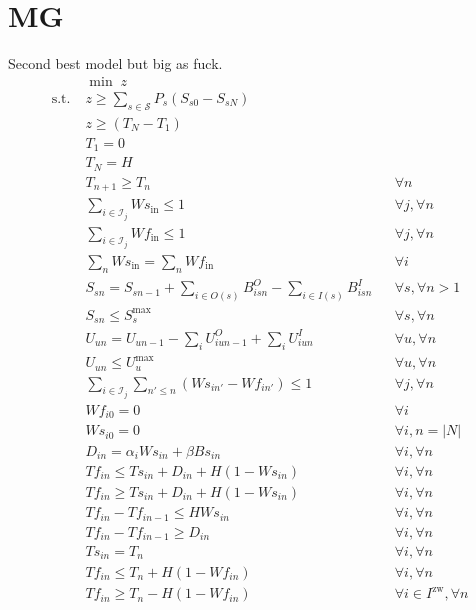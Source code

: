 \section{MG}
Second best model but big as fuck.
\begin{align}
&\min \; z &&\\
\text{s.t.}\; &z \ge \sum_{s\in \mathcal{S}} P_s (S_{s0} - S_{sN}) && \\
		  & z \ge (T_N - T_1)  &&\\
		  & T_1 = 0 && \\
		  & T_N = H && \\
		  & T_{n+1} \ge T_n && \forall n \\
		  & \sum_{i \in \mathcal{I}_j} Ws_{\text{in}} \le 1 && \forall j, \forall n \\
		  & \sum_{i \in \mathcal{I}_j} Wf_{\text{in}} \le 1 && \forall j, \forall n \\
		  & \sum_n Ws_{\text{in}} = \sum_n Wf_{\text{in}} && \forall i \\
		  & S_{sn} = S_{sn-1} + \sum_{i \in O(s)} B_{isn}^O - \sum_{i \in I(s)} B_{isn}^I && \forall s, \forall n > 1 \\
		  & S_{sn} \le S_{s}^{\text{max}} && \forall s, \forall n \\
		  & U_{un} = U_{un-1} - \sum_i U_{iun-1}^O + \sum_i U_{iun}^I && \forall u, \forall n\\
		  & U_{un} \le U_{u}^{\text{max}} && \forall u, \forall n \\
		  & \sum_{i \in \mathcal{I}_j} \sum_{n' \le n} (Ws_{in'} - Wf_{in'}) \le 1 && \forall j, \forall n \\
		  & Wf_{i0} = 0 && \forall i \\
		  & Ws_{i0} = 0 && \forall i , n = |N| \\
		  & D_{in} = \alpha_i Ws_{in} + \beta Bs_{in} && \forall i, \forall n \\
		  & Tf_{in} \le Ts_{in} + D_{in} + H(1 - Ws_{in}) && \forall i, \forall n \\
		  & Tf_{in} \ge Ts_{in} + D_{in} + H(1 - Ws_{in}) && \forall i, \forall n \\
		  & Tf_{in} - Tf_{in-1} \le H Ws_{in} && \forall i, \forall n \\
		  & Tf_{in} - Tf_{in-1} \ge D_{in} && \forall i, \forall n \\
		  & Ts_{in} = T_n && \forall i, \forall n \\
		  & Tf_{in} \le T_n + H(1 - Wf_{in}) && \forall i, \forall n \\
		  & Tf_{in} \ge T_n - H(1 - Wf_{in}) && \forall i \in I^{\text{zw}}, \forall n \\

\end{align}
